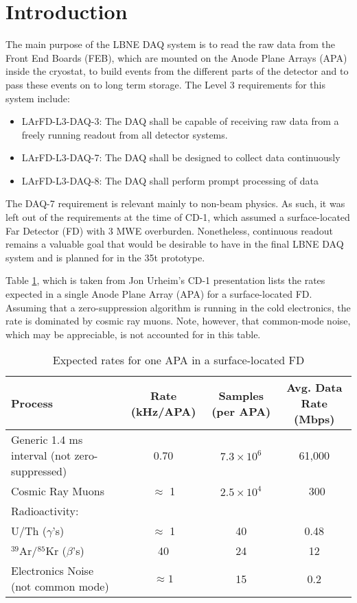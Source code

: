 \section{Introduction}

The main purpose of the LBNE DAQ system is to read the raw data from the 
Front End Boards (FEB), which are mounted on the Anode Plane Arrays (APA) inside
the cryostat, to build events from the different parts
of the detector and to pass these events on to long term storage.
The Level 3 requirements for this system include\cite{DAQ_REQ}:

\begin{itemize}
\item{LArFD-L3-DAQ-3: The DAQ shall be capable of receiving raw data from a freely running readout from all detector systems.}
\item{LArFD-L3-DAQ-7: The DAQ shall be designed to collect data continuously}
\item{LArFD-L3-DAQ-8: The DAQ shall perform prompt processing of data}
\end{itemize}
The DAQ-7 requirement is relevant mainly to non-beam physics. 
As such, it was left out of the requirements at the time of CD-1, which 
assumed a surface-located Far Detector (FD) with 3 MWE overburden. 
Nonetheless, continuous readout remains a valuable goal that would be desirable 
to have in the final LBNE DAQ system and is planned for in the 35t prototype.

Table \ref{tab:rates}, which is taken from Jon Urheim's CD-1 presentation
\cite{DAQ_CD1}
lists
the rates expected in a single Anode Plane Array (APA) for a surface-located
FD.
Assuming that a zero-suppression
algorithm is running in the cold electronics,
the rate is dominated by cosmic ray muons.
Note, however, that common-mode noise,
which may be appreciable,
is not accounted for in this table.

\begin{table}[h]
\begin{tabular}{|p{1.5in}|c|c|c|}
\hline
Process&Rate (kHz/APA)& Samples (per APA) & Avg. Data Rate (Mbps)\\
\hline
Generic 1.4 ms interval (not zero-suppressed)&
0.70&$7.3 \times 10^6$& 61,000\\
\hline
Cosmic Ray Muons & $\approx$ 1 & $2.5 \times 10^4$ & ~300 \\
\hline
Radioactivity: &&& \\
U/Th ($\gamma$'s) & $\approx$ 1&40& 0.48\\
$^{39}$Ar/$^{85}$Kr ($\beta$'s)&40&24&12\\
\hline
Electronics Noise (not common mode) & $\approx 1$ & 15 & 0.2\\
\hline
\end{tabular}
\caption{\label{tab:rates} Expected rates for one APA in a surface-located
FD}
\end{table}

